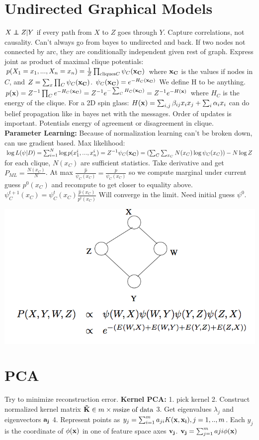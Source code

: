 \section{Undirected Graphical Models}
$X \independent Z \vert Y$ if every path from $X$ to $Z$ goes through $Y$. Capture correlations, not causality. Can't always go from bayes to undirected and back. If two nodes not connected by arc, they are conditionally independent given rest of graph. Express joint as product of maximal clique potentials: $p(X_1 = x_1, ..., X_n=x_n) = \frac{1}{Z} \prod_{\text{cliques} C} \psi_C(\mathbf{x_C})$ where $\mathbf{x_C}$ is the values if nodes in $C$, and $Z = \sum_x \prod_{C} \psi_C(\mathbf{x_C})$. $\psi_C(\mathbf{x_C}) = e^{-H_C(\mathbf{x_C})}$ We define H to be anything. $p(\mathbf{x}) = Z^{-1}\prod_C e^{-H_C(\mathbf{x_C})} = Z^{-1} e^{-\sum_C H_C(\mathbf{x_C})} = Z^{-1} e^{-H(\mathbf{x})}$ where $H_C$ is the energy of the clique. For a 2D spin glass: $H(\mathbf{x}) = \sum_{i,j} \beta_{ij}x_i x_j + \sum_i \alpha_i x_i$ can do belief propagation like in bayes net with the messages. Order of updates is important. Potentials energy of agreement or disagreement in clique. \\
{\bf Parameter Learning: }  Because of normalization learning can't be broken down, can use gradient based. Max likelihood: $\log L(\psi \vert D) = \sum_{i=1}^N \log p(x_1^i, ... , x_n^i) = Z^{-1} \psi_C(\mathbf{x_C}) = (\sum_C \sum_{x_C} N(x_C)\log \psi_C(x_C)) - N \log Z$ for each clique, $N(x_C)$ are sufficient statistics. Take derivative and get $P_{ML} = \frac{N(x_C)}{N}$. At max $\frac{\hat{p}}{\psi_C(x_C)} = \frac{p}{\psi_C(x_C)}$ so we compute marginal under current guess $p^0(x_C)$ and recompute to get closer to equality above. $\psi^{t+1}_C(x_C) = \psi^{t}_{C}(x_C) \frac{\hat{p}(x_C)}{p^t(x_C)}$ Will converge in the limit. Need initial guess $\psi^0$.

\includegraphics[width=0.5\linewidth]{mrf.png}

\section{PCA}
Try to minimize reconstruction error.
{\bf Kernel PCA:} 1. pick kernel 2. Construct normalized kernel matrix $\mathbf{\tilde{K}} \in m \times m \text{size of data}$ 3. Get eigenvalues $\lambda_j$ and eigenvectors $\mathbf{a_j}$ 4. Represent points as $y_j = \sum_{i=1}^{m} a_{ji}K(\mathbf{x}, \mathbf{x_i}), j = 1, .., m$. Each $y_j$ is the coordinate of $\phi(\mathbf{x})$ in one of feature space axes $\mathbf{v_j}$. $\mathbf{v_j} = \sum_{j=1}^m aji\phi(\mathbf{x})$

